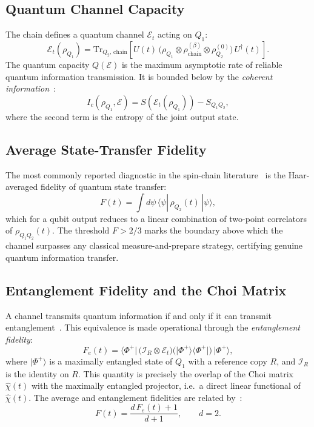 \documentclass[12pt,a4paper]{article}
\begin{document}
\subsection{Quantum Channel Capacity}

The chain defines a quantum channel $\mathcal{E}_t$ acting on $Q_1$:
\begin{equation}
    \mathcal{E}_t(\rho_{Q_1}) =
    \mathrm{Tr}_{Q_2,\,\mathrm{chain}}\!\left[
        U(t)\,\bigl(\rho_{Q_1} \otimes \rho_{\mathrm{chain}}^{(\beta)}
        \otimes \rho_{Q_2}^{(0)}\bigr)\,U^\dagger(t)
    \right].
\end{equation}
The quantum capacity $Q(\mathcal{E})$ is the maximum asymptotic rate of reliable
quantum information transmission. It is bounded below by the \emph{coherent
information}~\cite{Schumacher1996,Lloyd1997}:
\begin{equation}
    I_c(\rho_{Q_1},\mathcal{E}) = S\!\left(\mathcal{E}_t(\rho_{Q_1})\right)
    - S_{Q_1 Q_2},
\end{equation}
where the second term is the entropy of the joint output state.

\subsection{Average State-Transfer Fidelity}

The most commonly reported diagnostic in the spin-chain literature~\cite{bose2003}
is the Haar-averaged fidelity of quantum state transfer:
\begin{equation}
    F(t) = \int d\psi\,\langle\psi|\,\rho_{Q_2}(t)\,|\psi\rangle,
\end{equation}
which for a qubit output reduces to a linear combination of two-point correlators
of $\rho_{Q_1 Q_2}(t)$. The threshold $F > 2/3$ marks the boundary above which
the channel surpasses any classical measure-and-prepare strategy, certifying
genuine quantum information transfer.

\subsection{Entanglement Fidelity and the Choi Matrix}

A channel transmits quantum information if and only if it can transmit
entanglement~\cite{Bennett1996,Horodecki1999}. This equivalence is made
operational through the \emph{entanglement fidelity}:
\begin{equation}
    F_e(t) = \langle\Phi^+|\,
    \bigl(\mathcal{I}_R \otimes \mathcal{E}_t\bigr)
    \bigl(|\Phi^+\rangle\langle\Phi^+|\bigr)
    \,|\Phi^+\rangle,
\end{equation}
where $|\Phi^+\rangle$ is a maximally entangled state of $Q_1$ with a reference
copy $R$, and $\mathcal{I}_R$ is the identity on $R$. This quantity is precisely
the overlap of the Choi matrix $\hat{\chi}(t)$ with the maximally entangled
projector, i.e.\ a direct linear functional of $\hat{\chi}(t)$. The average and
entanglement fidelities are related by~\cite{Nielsen2002}:
\begin{equation}
    F(t) = \frac{d\,F_e(t) + 1}{d + 1},
    \qquad d = 2.
\end{equation}
\end{document}
